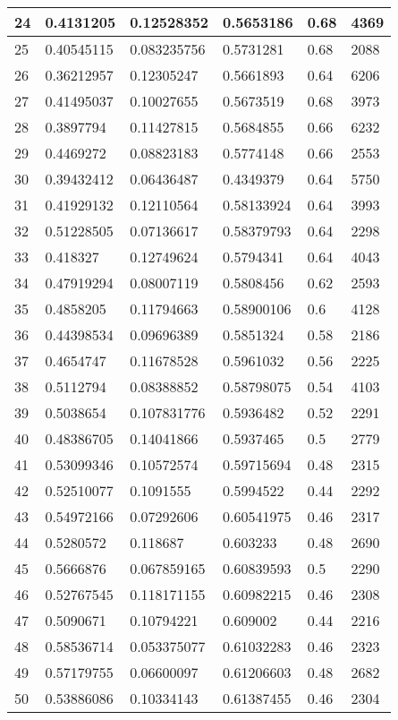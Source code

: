 \begin{longtable}{|l|l|l|l|l|l|}
24 & 0.4131205 & 0.12528352 & 0.5653186 & 0.68 & 4369 \\ \hline 
25 & 0.40545115 & 0.083235756 & 0.5731281 & 0.68 & 2088 \\ \hline 
26 & 0.36212957 & 0.12305247 & 0.5661893 & 0.64 & 6206 \\ \hline 
27 & 0.41495037 & 0.10027655 & 0.5673519 & 0.68 & 3973 \\ \hline 
28 & 0.3897794 & 0.11427815 & 0.5684855 & 0.66 & 6232 \\ \hline 
29 & 0.4469272 & 0.08823183 & 0.5774148 & 0.66 & 2553 \\ \hline 
30 & 0.39432412 & 0.06436487 & 0.4349379 & 0.64 & 5750 \\ \hline 
31 & 0.41929132 & 0.12110564 & 0.58133924 & 0.64 & 3993 \\ \hline 
32 & 0.51228505 & 0.07136617 & 0.58379793 & 0.64 & 2298 \\ \hline 
33 & 0.418327 & 0.12749624 & 0.5794341 & 0.64 & 4043 \\ \hline 
34 & 0.47919294 & 0.08007119 & 0.5808456 & 0.62 & 2593 \\ \hline 
35 & 0.4858205 & 0.11794663 & 0.58900106 & 0.6 & 4128 \\ \hline 
36 & 0.44398534 & 0.09696389 & 0.5851324 & 0.58 & 2186 \\ \hline 
37 & 0.4654747 & 0.11678528 & 0.5961032 & 0.56 & 2225 \\ \hline 
38 & 0.5112794 & 0.08388852 & 0.58798075 & 0.54 & 4103 \\ \hline 
39 & 0.5038654 & 0.107831776 & 0.5936482 & 0.52 & 2291 \\ \hline 
40 & 0.48386705 & 0.14041866 & 0.5937465 & 0.5 & 2779 \\ \hline 
41 & 0.53099346 & 0.10572574 & 0.59715694 & 0.48 & 2315 \\ \hline 
42 & 0.52510077 & 0.1091555 & 0.5994522 & 0.44 & 2292 \\ \hline 
43 & 0.54972166 & 0.07292606 & 0.60541975 & 0.46 & 2317 \\ \hline 
44 & 0.5280572 & 0.118687 & 0.603233 & 0.48 & 2690 \\ \hline 
45 & 0.5666876 & 0.067859165 & 0.60839593 & 0.5 & 2290 \\ \hline 
46 & 0.52767545 & 0.118171155 & 0.60982215 & 0.46 & 2308 \\ \hline 
47 & 0.5090671 & 0.10794221 & 0.609002 & 0.44 & 2216 \\ \hline 
48 & 0.58536714 & 0.053375077 & 0.61032283 & 0.46 & 2323 \\ \hline 
49 & 0.57179755 & 0.06600097 & 0.61206603 & 0.48 & 2682 \\ \hline 
50 & 0.53886086 & 0.10334143 & 0.61387455 & 0.46 & 2304 \\ \hline 
\end{longtable}